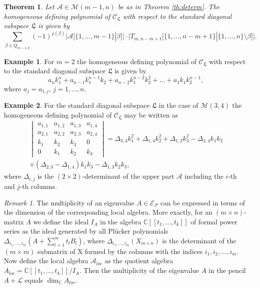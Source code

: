 \documentclass[10pt,twoside,a4paper,reqno]{amsart}
\theoremstyle{plain}
\newtheorem{theo+}           {Theorem}
\theoremstyle{definition}
\newtheorem{exam+}           {Example}
\theoremstyle{remark}
\newtheorem{rema+}           {Remark}
\newenvironment{theorem}{\begin{theo+}}{\end{theo+}}
\newenvironment{remark}{\begin{rema+}}{\end{rema+}}
\newenvironment{example}{\begin{exam+}}{\end{exam+}}
\begin{document}
\begin{theorem}\label{th:sds}
Let ${\mathcal A}\in{\mathcal {M}}(m-1,n)$ be as in Theorem \ref{th:determ}. The homogeneous defining polynomial of ${\mathcal C}_{\mathfrak L}$ with respect to the standard diagonal subspace ${\mathfrak L}$ is given by
$$\sum_{{\beta}\in Q_{m-1,n}}(-1)^{\rho({\beta})}\Big|{\mathcal A}\big[\{1,\ldots,m-1\}|{\beta}\big]\Big|\cdot
\Big|T_{m,n-m+1}\big[\{1,\ldots,n-m+1\}|\{1,\ldots,n\}\setminus{\beta}\big]\Big|.$$
\end{theorem}

\begin{example} For $m=2$ the homogeneous defining polynomial of ${\mathcal C}_{\mathfrak L}$ with
respect to the standard diagonal subspace ${\mathfrak L}$ is given by 
$$a_nk_1^n+a_{n-1}k_1^{n-1}k_2+a_{n-2}k_1^{n-2}k_2^2+\ldots+a_1k_1k_2^{n-1},$$
where $a_j=a_{1,j}$, $j=1,\ldots,n$.
\end{example}

\begin {example} For the standard diagonal  subspace ${\mathfrak L}$ in the case of  ${\mathcal {M}}(3,4)$ the homogeneous defining polynomial of ${\mathcal C}_{\mathfrak L}$ may be written as
\begin{multline*}
\begin{vmatrix} a_{1,1}&a_{1,2}&a_{1,3}&a_{1,4}\\
                                a_{2,1}&a_{2,2}&a_{2,3}&a_{2,4}\\
                                k_1&k_2&k_3&0\\
                                0&k_1&k_2&k_3
 \end{vmatrix}=\Delta_{3,4}k_1^2+\Delta_{1,4}k_2^2+\Delta_{1,2}k_3^2-\Delta_{2,4}k_1k_2\\
+(\Delta_{2,3}-\Delta_{1,4})k_1k_3-\Delta_{1,3}k_2k_3,
\end{multline*}
 where $\Delta_{i,j}$ is the $(2\times 2)$-determinant of the upper part ${\mathcal A}$ including the $i$-th and $j$-th columns.
\end{example}

\begin{remark}
The multiplicity of an eigenvalue $A\in {\mathcal E}_{\mathcal P}$ can be  expressed in terms of the
dimension of the corresponding local algebra. More exactly,  for an $(m\times n)$-matrix $A$ we
define the ideal $I_A$ in the algebra
${\mathbb {C}}[[t_1,\dots,t_k]]$ of formal power series as the ideal generated
by all Pl\"ucker polynomials $\Delta_{i_1,\dots,i_m}(A+\sum_{l=1}^m
t_lB_l)$, where $\Delta_{i_1,\dots,i_m}(X_{m\times n})$ is the 
determinant of the $(m\times m)$ submatrix of X formed by the columns 
with the indices $i_1, i_2,\dots,i_m$. Now define the local algebra ${\mathcal A}_{loc}$ as the quotient algebra
$A_{loc}={\mathbb {C}}[[t_1,\dots,t_k]]/I_A$. Then the multiplicity of the eigenvalue $A$ in the pencil $A+{\mathcal L}$
equals $\dim_{\mathbb {C}} A_{loc}$.
\end{remark}
\end{document}
